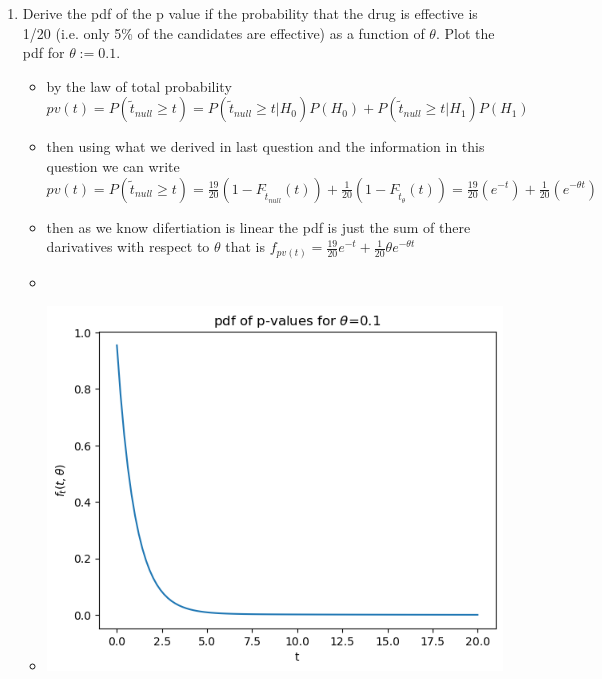 \documentclass[12pt,twoside]{article}
\begin{document}
\begin{enumerate}
\begin{enumerate}
\item Derive the pdf of the p value if the probability that the drug is effective is 1/20 (i.e. only 5\% of the candidates are effective) as a function of $\theta$. Plot the pdf for $\theta:=0.1$. 
\begin{itemize}
  \color{blue}
  \item by the law of total probability $pv(t)=P(\tilde{t}_{null}\geq t)=P(\tilde{t}_{null}\geq t|H_0)P(H_0)+P(\tilde{t}_{null}\geq t|H_1)P(H_1)$
  \item then using what we derived in last question and the information in this question we can write $pv(t)=P(\tilde{t}_{null}\geq t)=\frac{19}{20}(1-F_{\tilde{t}_{null}}(t))+\frac{1}{20}(1-F_{\tilde{t}_{\theta}}(t))=\frac{19}{20}(e^{-t})+\frac{1}{20}(e^{-\theta t})$
  \item then as we know difertiation is linear the pdf is just the sum of there darivatives with respect to $\theta$ that is $f_{pv(t)}=\frac{19}{20}e^{-t}+\frac{1}{20}\theta e^{-\theta t}$
    \item \inputminted[firstline=50, lastline=51, breaklines=True]{python}{hw7.py}
  \item \includegraphics{homework/homework_7/immages/2b_1.png} 
\end{itemize}


\end{enumerate}
\end{enumerate}
\end{document}
